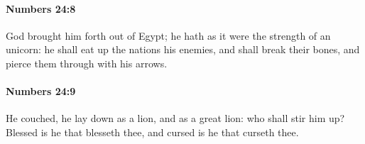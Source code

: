 		\paragraph{Numbers 24:8} %
			\label{NUMBERS-24-8}

			God brought him forth out of Egypt; he hath as it were the strength of an unicorn: he shall eat up the nations his enemies, and shall break their bones, and pierce them through with his arrows.


		\paragraph{Numbers 24:9} %
			\label{NUMBERS-24-9}

			He couched, he lay down as a lion, and as a great lion: who shall stir him up? Blessed is he that blesseth thee, and cursed is he that curseth thee.


